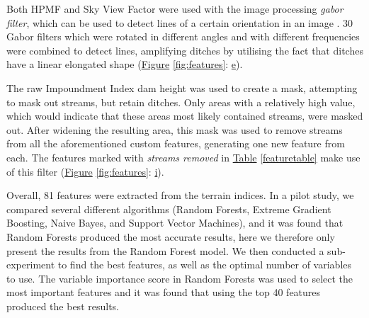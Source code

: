 \documentclass[11pt, review]{elsarticle} %
\begin{document}
Both HPMF and Sky View Factor were used with the image processing \textit{gabor filter}, which can be used to detect lines of a certain orientation in an image \citep{gabor}. 30 Gabor filters which were rotated in different angles and with different frequencies were combined to detect lines, amplifying ditches by utilising the fact that ditches have a linear elongated shape (\hyperref[fig:features]{Figure} \ref{fig:features}: \hyperref[fig:features]{e}).

\label{impoundmentstreamremoval}
The raw Impoundment Index dam height was used to create a mask, attempting to mask out streams, but retain ditches. Only areas with a relatively high value, which would indicate that these areas most likely contained streams, were masked out. After widening the resulting area, this mask was used to remove streams from all the aforementioned custom features, generating one new feature from each. The features marked with \textit{streams removed} in \hyperref[featuretable]{Table} \ref{featuretable} make use of this filter (\hyperref[fig:features]{Figure} \ref{fig:features}: \hyperref[fig:features]{i}).

Overall, 81 features were extracted from the terrain indices. In a pilot study, we compared several different algorithms (Random Forests, Extreme Gradient Boosting, Naive Bayes, and Support Vector Machines), and it was found that Random Forests produced the most accurate results, here we therefore only present the results from the Random Forest model. We then conducted a sub-experiment to find the best features, as well as the optimal number of variables to use. The variable importance score in Random Forests was used to select the most important features and it was found that using the top 40 features produced the best results.
\end{document}
